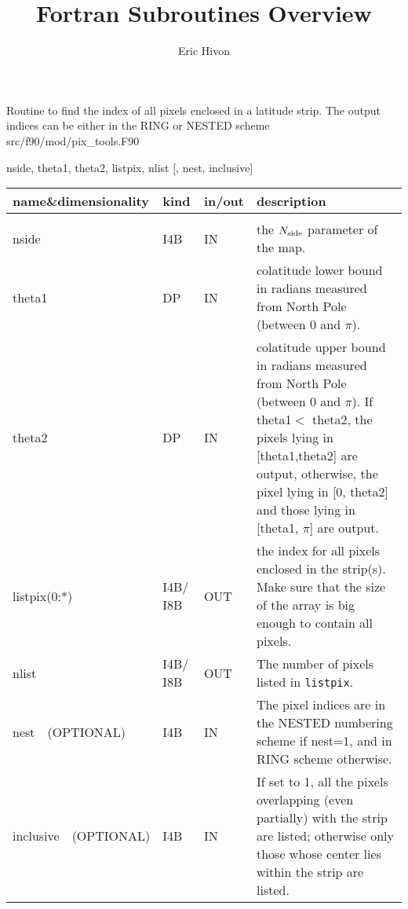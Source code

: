 
\sloppy


\title{\healpix Fortran Subroutines Overview}
 \section[query\_strip]{ }
\label{sub:query_strip}
\author{Eric Hivon}

\begin{facility}
{Routine to find the index of all pixels enclosed in a latitude strip. The output indices can be either in the RING or NESTED scheme} 
{src/f90/mod/pix\_tools.F90}
\end{facility}

\begin{f90format}
{nside, theta1, theta2, listpix, nlist [, nest, inclusive]}
\end{f90format}

\begin{arguments}
{
\begin{tabular}{p{0.28\hsize} p{0.05\hsize} p{0.1\hsize} p{0.47\hsize}} \hline  
\textbf{name\&dimensionality} & \textbf{kind} & \textbf{in/out} & \textbf{description} \\ \hline
                   &   &   &                           \\ %
nside & I4B & IN & the ${N_{\rm side}}$ parameter of the map. \\
theta1 & DP & IN & colatitude lower bound in radians measured from North Pole
                   (between 0 and $\pi$). \\
theta2 & DP & IN & colatitude upper bound in radians measured from North Pole (between 0 and $\pi$). If
                   theta1$<$ theta2, the pixels lying in [theta1,theta2]
                   are output, otherwise, the pixel lying in [0,
                   theta2] and those lying in [theta1, $\pi$] are output.\\
listpix(0:*) & I4B/ I8B & OUT & the index for all pixels enclosed in the
                   strip(s). Make sure that the size of the array is big enough to contain all pixels. \\ 
nlist & I4B/ I8B & OUT & The number of pixels listed in {\tt listpix}. \\
nest\ \ (OPTIONAL) & I4B & IN &  The pixel indices are in the NESTED numbering scheme if nest=1, and in RING scheme otherwise. \\
inclusive\ \ (OPTIONAL) & I4B & IN & If set to 1, all the pixels overlapping
                   (even partially)
                   with the strip are listed; otherwise only those whose
                   center lies within the strip are listed. \\
\end{tabular}
}
\end{arguments}

